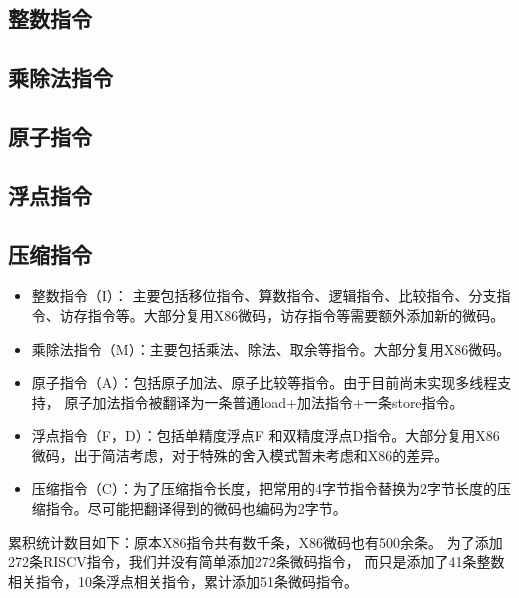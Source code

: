 \subsection{整数指令}


\subsection{乘除法指令}


\subsection{原子指令}


\subsection{浮点指令}


\subsection{压缩指令}


\begin{itemize}
  \item 整数指令（I）： 主要包括移位指令、算数指令、逻辑指令、比较指令、分支指令、访存指令等。大部分复用X86微码，访存指令等需要额外添加新的微码。

  \item 乘除法指令（M）：主要包括乘法、除法、取余等指令。大部分复用X86微码。

  \item 原子指令（A）：包括原子加法、原子比较等指令。由于目前尚未实现多线程支持，
  原子加法指令被翻译为一条普通load+加法指令+一条store指令。

  \item 浮点指令（F，D）：包括单精度浮点F 和双精度浮点D指令。大部分复用X86微码，出于简洁考虑，对于特殊的舍入模式暂未考虑和X86的差异。

  \item 压缩指令（C）：为了压缩指令长度，把常用的4字节指令替换为2字节长度的压缩指令。尽可能把翻译得到的微码也编码为2字节。

\end{itemize}

累积统计数目如下：原本X86指令共有数千条，X86微码也有500余条。
为了添加272条RISCV指令，我们并没有简单添加272条微码指令，
而只是添加了41条整数相关指令，10条浮点相关指令，累计添加51条微码指令。





